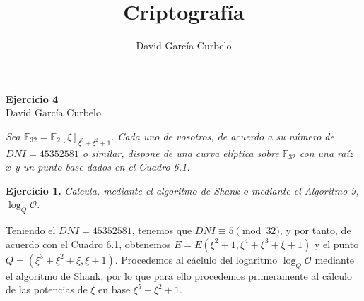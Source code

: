 \documentclass[fleqn]{article}
\author{David García Curbelo}
\title{Criptografía}
\def\F{\mathds{F}}
\begin{document}
    \begin{center}
        \LARGE{\textbf{Ejercicio 4}} \\
        \Large{David García Curbelo} 
    \end{center}

    \vspace{1cm}     

    \textit{Sea $\F_{32} = \F_2 [\xi]_{\xi^5 + \xi^2 + 1}$. Cada uno de vosotros, de acuerdo a su número de $DNI = 45352581$ o similar,
            dispone de una curva elíptica sobre $\F_{32}$ con una raíz $x$ y un punto base dados en el Cuadro 6.1.}

    \vspace{0.5cm}   

    \textbf{Ejercicio 1. }\textit{Calcula, mediante el algoritmo de Shank o mediante el Algoritmo 9, $\log_Q \mathcal{O}$.}
    \vspace{0.5cm}

    Teniendo el $DNI = 45352581$, tenemos que $DNI \equiv 5 \pmod{32}$, y por tanto, de acuerdo con el Cuadro 6.1, obtenemos 
    $E = E(\xi^2 + 1, \xi^4 + \xi^3 + \xi + 1)$ y  el punto $Q = (\xi^3 + \xi^2 + \xi, \xi + 1)$. Procedemos al cáclulo del logaritmo 
    $\log_Q \mathcal{O}$ mediante el algoritmo de Shank, por lo que para ello procedemos primeramente al cálculo de las potencias de
    $\xi$ en base $\xi^5 + \xi^2 + 1$.
\end{document}
